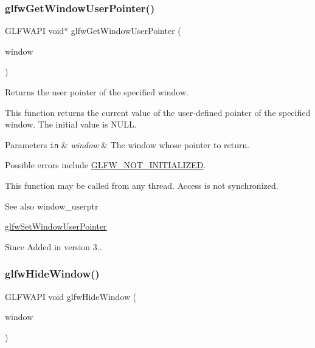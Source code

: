 \subsubsection{\texorpdfstring{glfw\+Get\+Window\+User\+Pointer()}{glfwGetWindowUserPointer()}}
{\footnotesize\ttfamily G\+L\+F\+W\+A\+PI void$\ast$ glfw\+Get\+Window\+User\+Pointer (\begin{DoxyParamCaption}\item[{\hyperlink{group__window_ga3c96d80d363e67d13a41b5d1821f3242}{G\+L\+F\+Wwindow} $\ast$}]{window }\end{DoxyParamCaption})}



Returns the user pointer of the specified window. 

This function returns the current value of the user-\/defined pointer of the specified window. The initial value is {\ttfamily N\+U\+LL}.


\begin{DoxyParams}[1]{Parameters}
\mbox{\tt in}  & {\em window} & The window whose pointer to return.\\
\hline
\end{DoxyParams}
Possible errors include \hyperlink{group__errors_ga2374ee02c177f12e1fa76ff3ed15e14a}{G\+L\+F\+W\+\_\+\+N\+O\+T\+\_\+\+I\+N\+I\+T\+I\+A\+L\+I\+Z\+ED}.

This function may be called from any thread. Access is not synchronized.

\begin{DoxySeeAlso}{See also}
window\+\_\+userptr 

\hyperlink{group__window_gacc9e68faee3c1763b54cd9bc405cf43e}{glfw\+Set\+Window\+User\+Pointer}
\end{DoxySeeAlso}
\begin{DoxySince}{Since}
Added in version 3.. 
\end{DoxySince}
\mbox{\label{group__window_gaa17e287d521544bdeceafa09ac036e20}} 
\subsubsection{\texorpdfstring{glfw\+Hide\+Window()}{glfwHideWindow()}}
{\footnotesize\ttfamily G\+L\+F\+W\+A\+PI void glfw\+Hide\+Window (\begin{DoxyParamCaption}\item[{\hyperlink{group__window_ga3c96d80d363e67d13a41b5d1821f3242}{G\+L\+F\+Wwindow} $\ast$}]{window }\end{DoxyParamCaption})}



